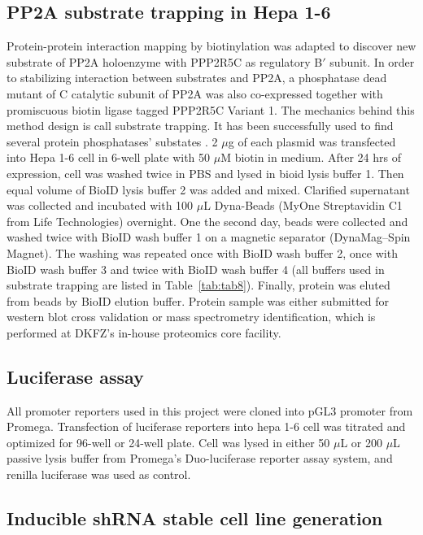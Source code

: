 \subsection{PP2A substrate trapping in Hepa 1-6}
Protein-protein interaction mapping by biotinylation \cite{roux_promiscuous_2012} was adapted to discover new substrate of PP2A holoenzyme with PPP2R5C as regulatory B$'$ subunit. In order to stabilizing interaction between substrates and PP2A, a phosphatase dead mutant of C catalytic subunit of PP2A was also co-expressed together with promiscuous biotin ligase tagged PPP2R5C Variant 1. The mechanics behind this method design is call substrate trapping. It has been successfully used to find several protein phosphatases' substates \cite{boubekeur_new_2011, flint_development_1997,wu_identification_2006}. 2 $\mu$g of each plasmid was transfected into Hepa 1-6 cell in 6-well plate with 50 $\mu$M biotin in medium. After 24 hrs of expression, cell was washed twice in PBS and lysed in \gls{bioid} lysis buffer 1. Then equal volume of BioID lysis buffer 2 was added and mixed. Clarified supernatant was collected and incubated with 100 $\mu$L Dyna-Beads (MyOne Streptavidin C1 from Life Technologies) overnight. One the second day, beads were collected and washed twice with BioID wash buffer 1 on a magnetic separator (DynaMag{\texttrademark}--Spin Magnet). The washing was repeated once with BioID wash buffer 2, once with BioID wash buffer 3 and twice with BioID wash buffer 4 (all buffers used in substrate trapping are listed in Table~\ref{tab:tab8}). Finally, protein was eluted from beads by BioID elution buffer. Protein sample was either submitted for western blot cross validation or mass spectrometry identification, which is performed at DKFZ's in-house proteomics core facility. 

\subsection{Luciferase assay}

All promoter reporters used in this project were cloned into pGL3 promoter from Promega. Transfection of luciferase reporters into hepa 1-6 cell was titrated and optimized for 96-well or 24-well plate. Cell was lysed in either 50 $\mu$L or 200 $\mu$L passive lysis buffer from Promega's Duo-luciferase reporter assay system, and renilla luciferase was used as control. 

\subsection{Inducible shRNA stable cell line generation}

